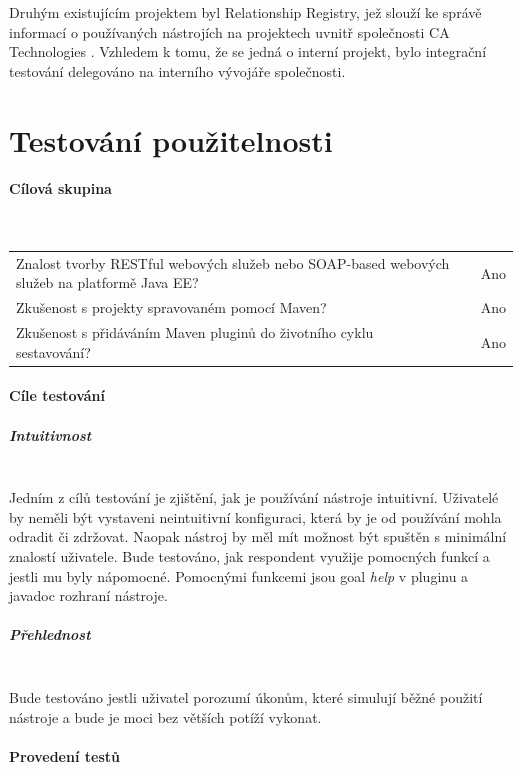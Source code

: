 \documentclass[11pt,twoside,a4paper]{book}
\begin{document}
Druhým existujícím projektem byl Relationship Registry, jež slouží ke správě
informací o používaných nástrojích na projektech uvnitř společnosti CA
Technologies \cite{CAHome}. Vzhledem k tomu, že se jedná o interní projekt, bylo
integrační testování delegováno na interního vývojáře společnosti.

\section{Testování použitelnosti}

\paragraph{Cílová skupina}
\mbox{}\\

\begin{tabular}{m{10cm} m{1cm} m{3cm}}
Znalost tvorby RESTful webových služeb nebo SOAP-based webových služeb na
platformě Java EE? & & Ano \\
Zkušenost s projekty spravovaném pomocí Maven? & & Ano \\
Zkušenost s přidáváním Maven pluginů do životního cyklu sestavování? & & Ano \\
\end{tabular}

\paragraph{Cíle testování}

\subparagraph{Intuitivnost}
\mbox{}\\

Jedním z cílů testování je zjištění, jak je používání nástroje intuitivní.
Uživatelé by neměli být vystaveni neintuitivní konfiguraci, která by je od
používání mohla odradit či zdržovat. Naopak nástroj by měl mít možnost být
spuštěn s minimální znalostí uživatele. Bude testováno, jak respondent
využije pomocných funkcí a jestli mu byly nápomocné.
Pomocnými funkcemi jsou goal {\em help} v pluginu a javadoc rozhraní nástroje.

\subparagraph{Přehlednost}
\mbox{}\\

Bude testováno jestli uživatel porozumí úkonům, které simulují běžné použití
nástroje a bude je moci bez větších potíží vykonat.

\paragraph{Provedení testů}
\mbox{}\\
\end{document}
